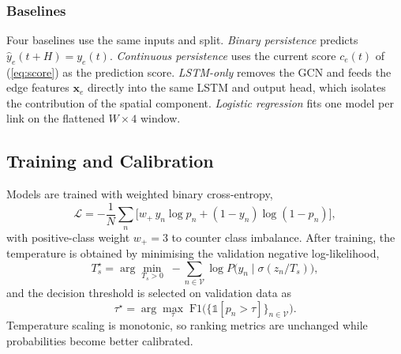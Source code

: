 \documentclass[conference]{IEEEtran}
\begin{document}
\subsubsection{Baselines}
Four baselines use the same inputs and split. \emph{Binary persistence} predicts $\hat{y}_e(t+H)=y_e(t)$. \emph{Continuous persistence} uses the current score $c_e(t)$ of (\ref{eq:score}) as the prediction score. \emph{LSTM-only} removes the GCN and feeds the edge features $\mathbf{x}_e$ directly into the same LSTM and output head, which isolates the contribution of the spatial component. \emph{Logistic regression} fits one model per link on the flattened $W\times 4$ window.

\subsection{Training and Calibration}
Models are trained with weighted binary cross-entropy,
\begin{equation}
\mathcal{L}=-\frac{1}{N}\sum_{n}\big[w_+\, y_n\log p_n+(1-y_n)\log(1-p_n)\big],
\label{eq:loss}
\end{equation}
with positive-class weight $w_+=3$ to counter class imbalance. After training, the temperature is obtained by minimising the validation negative log-likelihood,
\begin{equation}
T_s^\star=\arg\min_{T_s>0}\; -\sum_{n\in\mathcal{V}}\log P\big(y_n \mid \sigma(z_n/T_s)\big),
\label{eq:tempfit}
\end{equation}
and the decision threshold is selected on validation data as
\begin{equation}
\tau^\star=\arg\max_{\tau}\; \mathrm{F1}\big(\{\mathbb{1}[p_n>\tau]\}_{n\in\mathcal{V}}\big).
\label{eq:thresh}
\end{equation}
Temperature scaling is monotonic, so ranking metrics are unchanged while probabilities become better calibrated.
\end{document}

